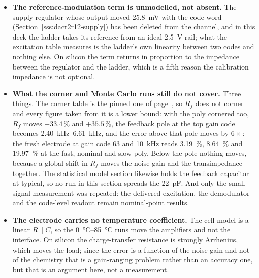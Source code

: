 \begin{itemize}[nosep]
  \item \textbf{The reference-modulation term is unmodelled, not absent.} The
    supply regulator whose output moved \SI{25.8}{\milli\volt} with the code word
    (Section~\ref{sss:dacr2r12-supply}) has been deleted from the channel, and
    in this deck the ladder takes its reference from an ideal
    \SI{2.5}{\volt} rail; what the excitation table measures is the ladder's own
    linearity between two codes and nothing else. On silicon the term returns in
    proportion to the impedance between the regulator and the ladder, which is a
    fifth reason the calibration impedance is not optional.
  \item \textbf{What the corner and Monte Carlo runs still do not cover.} Three
    things. The corner table is the pinned one of
    page~\pageref{p:pinned-passives}, so \(R_f\) does not
    corner and every figure taken from it is a lower bound: with the poly cornered
    too, \(R_f\) moves \(-33.4\,\%\) and \(+35.5\,\%\), the
    feedback pole at the top gain code becomes
    \SIrange{2.40}{6.61}{\kilo\hertz}, and the error above that pole moves by
    \(6\times\): the fresh electrode at gain code 63 and
    \SI{10}{\kilo\hertz} reads \SI{3.19}{\percent}, \SI{8.64}{\percent} and
    \SI{19.97}{\percent} at the fast, nominal and slow poly. Below the pole
    nothing moves, because a global shift in \(R_f\) moves the noise gain and
    the transimpedance together. The statistical model section likewise holds
    the feedback capacitor at typical, so no run in this section spreads the
    \SI{22}{\pico\farad}. And only the small-signal measurement was
    repeated: the delivered excitation, the demodulator and the code-level
    readout remain nominal-point results.
  \item \textbf{The electrode carries no temperature coefficient.} The cell
    model is a linear \(R \parallel C\), so the \SIrange{0}{85}{\celsius} runs
    move the amplifiers and not the interface. On silicon the charge-transfer
    resistance is strongly Arrhenius, which moves the load; since the error is a
    function of the noise gain and not of the chemistry that is a gain-ranging
    problem rather than an accuracy one, but that is an argument here, not a
    measurement.
\end{itemize}
